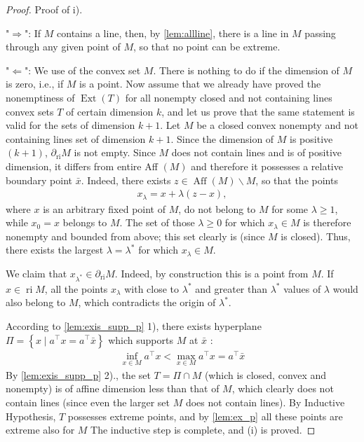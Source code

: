\documentclass{article}
\newcommand{\ri}{\operatorname{ri}}
\newcommand{\rb}{\partial_{\mathrm{ri}}}
\begin{document}
\begin{proof}\color{ForestGreen}
Proof of i).

"$\Rightarrow$": If $M$ contains a line, then, by \cref{lem:allline}, there is a line in $M$ passing through any given point of $M$, so that no point can be extreme.

"$\Leftarrow$": We use  of the convex set $M$.
There is nothing to do if the dimension of $M$ is zero, i.e., if $M$ is a point. Now assume that we already have proved the nonemptiness of $\operatorname{Ext}(T)$ for all nonempty closed and not containing lines convex sets $T$ of certain dimension $k$, and let us prove that the same statement is valid for the sets of dimension $k+1$. Let $M$ be a closed convex nonempty and not containing lines set of dimension $k+1$. Since the dimension of $M$ is positive $(k+1)$, $\rb M$ is not empty. Since $M$ does not contain lines and is of positive dimension, it differs from entire Aff $(M)$ and therefore it possesses a relative boundary point $\bar{x}$. Indeed, there exists $z \in \operatorname{Aff}(M) \backslash M$, so that the points
\begin{align*}
x_{\lambda}=x+\lambda(z-x),
\end{align*}
where $x$ is an arbitrary fixed point of $M$, do not belong to $M$ for some $\lambda \geq 1$, while $x_{0}=x$ belongs to $M$. The set of those $\lambda \geq 0$ for which $x_{\lambda} \in M$ is therefore nonempty and bounded from above; this set clearly is  (since $M$ is closed). Thus, there exists the largest $\lambda=\lambda^{*}$ for which $x_{\lambda} \in M$. 

We claim that $x_{\lambda^{*}}\in \rb M .$ Indeed, by construction this is a point from $M$. If $x\in \ri M$, all the points $x_{\lambda}$ with close to $\lambda^{*}$ and greater than $\lambda^{*}$ values of $\lambda$ would also belong to $M$, which contradicts the origin of $\lambda^{*}$.

According to \cref{lem:exis_supp_p} 1), there exists hyperplane $\Pi=\left\{x \mid a^{\top} x=a^{\top} \bar{x}\right\}$ which supports $M$ at $\bar{x}$ :
\begin{align*}
\inf _{x \in M} a^{\top} x<\max _{x \in M} a^{\top} x=a^{\top} \bar{x}
\end{align*}
By \cref{lem:exis_supp_p} 2)., the set $T=\Pi \cap M$ (which is closed, convex and nonempty) is of affine dimension less than that of $M$,  which clearly does not contain lines (since even the larger set $M$ does not contain lines). By Inductive Hypothesis, $T$ possesses extreme points, and by \cref{lem:ex_p} all these points are extreme also for $M$ The inductive step is complete, and (i) is proved.


\end{proof}
\end{document}
